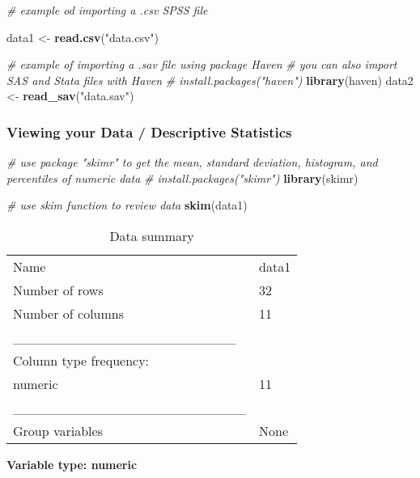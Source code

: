 \documentclass[
]{article}
\newenvironment{Shaded}{\begin{snugshade}}{\end{snugshade}}
\newcommand{\CommentTok}[1]{\textcolor[rgb]{0.56,0.35,0.01}{\textit{#1}}}
\newcommand{\KeywordTok}[1]{\textcolor[rgb]{0.13,0.29,0.53}{\textbf{#1}}}
\newcommand{\NormalTok}[1]{#1}
\newcommand{\StringTok}[1]{\textcolor[rgb]{0.31,0.60,0.02}{#1}}
\begin{document}
\begin{Shaded}
\begin{Highlighting}[]
\CommentTok{# example od importing a .csv SPSS file}

\NormalTok{data1 <-}\StringTok{ }\KeywordTok{read.csv}\NormalTok{(}\StringTok{"data.csv"}\NormalTok{)}


\CommentTok{# example of importing a .sav file using package Haven}
\CommentTok{# you can also import SAS and Stata files with Haven}
\CommentTok{# install.packages("haven")}
\KeywordTok{library}\NormalTok{(haven)}
\NormalTok{data2 <-}\StringTok{ }\KeywordTok{read_sav}\NormalTok{(}\StringTok{"data.sav"}\NormalTok{)}
\end{Highlighting}
\end{Shaded}

\hypertarget{viewing-your-data-descriptive-statistics}{%
\subsubsection{Viewing your Data / Descriptive
Statistics}\label{viewing-your-data-descriptive-statistics}}

\begin{Shaded}
\begin{Highlighting}[]
\CommentTok{# use package "skimr" to get the mean, standard deviation, histogram, and percentiles of numeric data}
\CommentTok{# install.packages("skimr")}
\KeywordTok{library}\NormalTok{(skimr)}

\CommentTok{# use skim function to review data}
\KeywordTok{skim}\NormalTok{(data1)}
\end{Highlighting}
\end{Shaded}

\begin{longtable}[]{@{}ll@{}}
\caption{Data summary}\tabularnewline
\toprule
\endhead
Name & data1\tabularnewline
Number of rows & 32\tabularnewline
Number of columns & 11\tabularnewline
\_\_\_\_\_\_\_\_\_\_\_\_\_\_\_\_\_\_\_\_\_\_\_ &\tabularnewline
Column type frequency: &\tabularnewline
numeric & 11\tabularnewline
\_\_\_\_\_\_\_\_\_\_\_\_\_\_\_\_\_\_\_\_\_\_\_\_ &\tabularnewline
Group variables & None\tabularnewline
\bottomrule
\end{longtable}

\textbf{Variable type: numeric}
\end{document}
